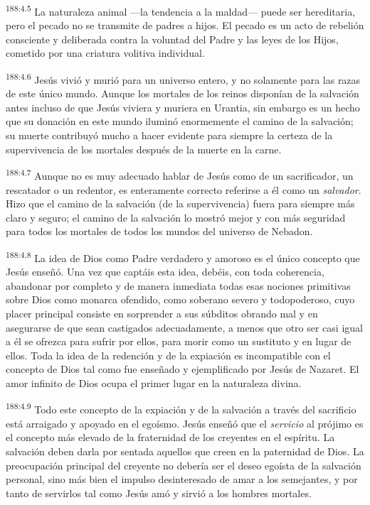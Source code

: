 \par
\textsuperscript{188:4.5} La naturaleza animal ---la tendencia a la maldad--- puede ser hereditaria, pero el pecado no se transmite de padres a hijos. El pecado es un acto de rebelión consciente y deliberada contra la voluntad del Padre y las leyes de los Hijos, cometido por una criatura volitiva individual.

\par
\textsuperscript{188:4.6} Jesús vivió y murió para un universo entero, y no solamente para las razas de este único mundo. Aunque los mortales de los reinos disponían de la salvación antes incluso de que Jesús viviera y muriera en Urantia, sin embargo es un hecho que su donación en este mundo iluminó enormemente el camino de la salvación; su muerte contribuyó mucho a hacer evidente para siempre la certeza de la supervivencia de los mortales después de la muerte en la carne.

\par
\textsuperscript{188:4.7} Aunque no es muy adecuado hablar de Jesús como de un sacrificador, un rescatador o un redentor, es enteramente correcto referirse a él como un \textit{salvador}. Hizo que el camino de la salvación (de la supervivencia) fuera para siempre más claro y seguro; el camino de la salvación lo mostró mejor y con más seguridad para todos los mortales de todos los mundos del universo de Nebadon.

\par
\textsuperscript{188:4.8} La idea de Dios como Padre verdadero y amoroso es el único concepto que Jesús enseñó. Una vez que captáis esta idea, debéis, con toda coherencia, abandonar por completo y de manera inmediata todas esas nociones primitivas sobre Dios como monarca ofendido, como soberano severo y todopoderoso, cuyo placer principal consiste en sorprender a sus súbditos obrando mal y en asegurarse de que sean castigados adecuadamente, a menos que otro ser casi igual a él se ofrezca para sufrir por ellos, para morir como un sustituto y en lugar de ellos. Toda la idea de la redención y de la expiación es incompatible con el concepto de Dios tal como fue enseñado y ejemplificado por Jesús de Nazaret. El amor infinito de Dios ocupa el primer lugar en la naturaleza divina.

\par
\textsuperscript{188:4.9} Todo este concepto de la expiación y de la salvación a través del sacrificio está arraigado y apoyado en el egoísmo. Jesús enseñó que el \textit{servicio} al prójimo es el concepto más elevado de la fraternidad de los creyentes en el espíritu. La salvación deben darla por sentada aquellos que creen en la paternidad de Dios. La preocupación principal del creyente no debería ser el deseo egoísta de la salvación personal, sino más bien el impulso desinteresado de amar a los semejantes, y por tanto de servirlos tal como Jesús amó y sirvió a los hombres mortales.

